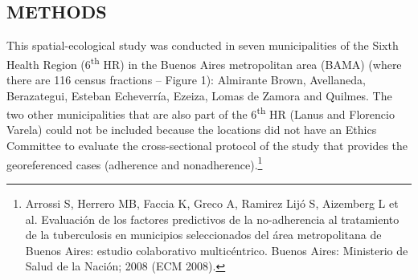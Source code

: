 \begin{multicols}{2}
\section*{METHODS}
\par{}This spatial-ecological study was conducted in seven municipalities of the Sixth Health Region (6\textsuperscript{th} HR) in the Buenos Aires metropolitan area (BAMA) (where there are 116 census fractions – Figure 1): Almirante Brown, Avellaneda, Berazategui, Esteban Echeverría, Ezeiza, Lomas de Zamora and Quilmes. The two other municipalities that are also part of the 6\textsuperscript{th} HR (Lanus and Florencio Varela) could not be included because the locations did not have an Ethics Committee to evaluate the cross-sectional protocol of the study that provides the georeferenced cases (adherence and nonadherence).\protect\footnote{ Arrossi S, Herrero MB, Faccia K, Greco A, Ramirez Lijó S, Aizemberg L et al. Evaluación de los factores predictivos de la no-adherencia al tratamiento de la tuberculosis en municipios seleccionados del área metropolitana de Buenos Aires: estudio colaborativo multicéntrico. Buenos Aires: Ministerio de Salud de la Nación; 2008 (ECM 2008).}\par{}
\par
{
}
\par

\end{multicols}
